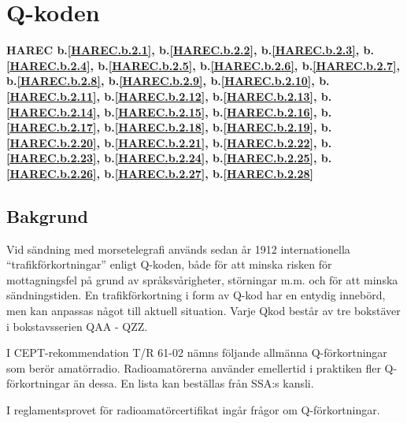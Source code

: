 \section{Q-koden}
\label{q-koden}
\textbf{
HAREC b.\ref{HAREC.b.2.1}\label{myHAREC.b.2.1},
 b.\ref{HAREC.b.2.2}\label{myHAREC.b.2.2},
 b.\ref{HAREC.b.2.3}\label{myHAREC.b.2.3},
 b.\ref{HAREC.b.2.4}\label{myHAREC.b.2.4},
 b.\ref{HAREC.b.2.5}\label{myHAREC.b.2.5},
 b.\ref{HAREC.b.2.6}\label{myHAREC.b.2.6},
 b.\ref{HAREC.b.2.7}\label{myHAREC.b.2.7},
 b.\ref{HAREC.b.2.8}\label{myHAREC.b.2.8},
 b.\ref{HAREC.b.2.9}\label{myHAREC.b.2.9},
 b.\ref{HAREC.b.2.10}\label{myHAREC.b.2.10},
 b.\ref{HAREC.b.2.11}\label{myHAREC.b.2.11},
 b.\ref{HAREC.b.2.12}\label{myHAREC.b.2.12},
 b.\ref{HAREC.b.2.13}\label{myHAREC.b.2.13},
 b.\ref{HAREC.b.2.14}\label{myHAREC.b.2.14},
 b.\ref{HAREC.b.2.15}\label{myHAREC.b.2.15},
 b.\ref{HAREC.b.2.16}\label{myHAREC.b.2.16},
 b.\ref{HAREC.b.2.17}\label{myHAREC.b.2.17},
 b.\ref{HAREC.b.2.18}\label{myHAREC.b.2.18},
 b.\ref{HAREC.b.2.19}\label{myHAREC.b.2.19},
 b.\ref{HAREC.b.2.20}\label{myHAREC.b.2.20},
 b.\ref{HAREC.b.2.21}\label{myHAREC.b.2.21},
 b.\ref{HAREC.b.2.22}\label{myHAREC.b.2.22},
 b.\ref{HAREC.b.2.23}\label{myHAREC.b.2.23},
 b.\ref{HAREC.b.2.24}\label{myHAREC.b.2.24},
 b.\ref{HAREC.b.2.25}\label{myHAREC.b.2.25},
 b.\ref{HAREC.b.2.26}\label{myHAREC.b.2.26},
 b.\ref{HAREC.b.2.27}\label{myHAREC.b.2.27},
 b.\ref{HAREC.b.2.28}\label{myHAREC.b.2.28}
}

\subsection{Bakgrund}

Vid sändning med morsetelegrafi används sedan år 1912 internationella
``trafikförkortningar'' enligt Q-koden, både för att minska risken för
mottagningsfel på grund av språksvårigheter, störningar m.m. och för
att minska sändningstiden. En trafikförkortning i form av Q-kod har en
entydig innebörd, men kan anpassas något till aktuell situation. Varje
Qkod består av tre bokstäver i bokstavsserien QAA - QZZ.

I CEPT-rekommendation T/R 61-02 nämns följande allmänna
Q-förkortningar som berör amatörradio.  Radioamatörerna använder
emellertid i praktiken fler Q-förkortningar än dessa. En lista kan
beställas från SSA:s kansli.

I reglamentsprovet för radioamatörcertifikat ingår frågor om Q-förkortningar.

